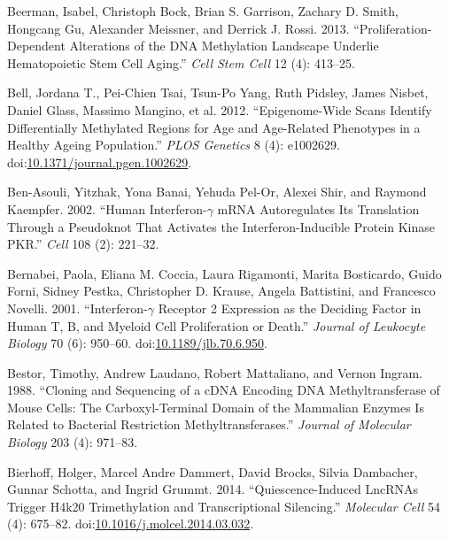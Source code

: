 \documentclass[onehalf,12pt]{beavtex}
\begin{document}
  \hypertarget{ref-BeermanProliferationdependentalterationsDNA2013}{}
  Beerman, Isabel, Christoph Bock, Brian S. Garrison, Zachary D. Smith,
  Hongcang Gu, Alexander Meissner, and Derrick J. Rossi. 2013.
  ``Proliferation-Dependent Alterations of the DNA Methylation Landscape
  Underlie Hematopoietic Stem Cell Aging.'' \emph{Cell Stem Cell} 12 (4):
  413--25.
  
  \hypertarget{ref-BellEpigenomeWideScansIdentify2012a}{}
  Bell, Jordana T., Pei-Chien Tsai, Tsun-Po Yang, Ruth Pidsley, James
  Nisbet, Daniel Glass, Massimo Mangino, et al. 2012. ``Epigenome-Wide
  Scans Identify Differentially Methylated Regions for Age and Age-Related
  Phenotypes in a Healthy Ageing Population.'' \emph{PLOS Genetics} 8 (4):
  e1002629.
  doi:\href{https://doi.org/10.1371/journal.pgen.1002629}{10.1371/journal.pgen.1002629}.
  
  \hypertarget{ref-Ben-AsouliHumaninterferongmRNA2002}{}
  Ben-Asouli, Yitzhak, Yona Banai, Yehuda Pel-Or, Alexei Shir, and Raymond
  Kaempfer. 2002. ``Human Interferon-\(\gamma\) mRNA Autoregulates Its
  Translation Through a Pseudoknot That Activates the Interferon-Inducible
  Protein Kinase PKR.'' \emph{Cell} 108 (2): 221--32.
  
  \hypertarget{ref-BernabeiInterferongreceptorexpression2001}{}
  Bernabei, Paola, Eliana M. Coccia, Laura Rigamonti, Marita Bosticardo,
  Guido Forni, Sidney Pestka, Christopher D. Krause, Angela Battistini,
  and Francesco Novelli. 2001. ``Interferon-\(\gamma\) Receptor 2
  Expression as the Deciding Factor in Human T, B, and Myeloid Cell
  Proliferation or Death.'' \emph{Journal of Leukocyte Biology} 70 (6):
  950--60.
  doi:\href{https://doi.org/10.1189/jlb.70.6.950}{10.1189/jlb.70.6.950}.
  
  \hypertarget{ref-BestorCloningsequencingcDNA1988}{}
  Bestor, Timothy, Andrew Laudano, Robert Mattaliano, and Vernon Ingram.
  1988. ``Cloning and Sequencing of a cDNA Encoding DNA Methyltransferase
  of Mouse Cells: The Carboxyl-Terminal Domain of the Mammalian Enzymes Is
  Related to Bacterial Restriction Methyltransferases.'' \emph{Journal of
  Molecular Biology} 203 (4): 971--83.
  
  \hypertarget{ref-BierhoffQuiescenceInducedLncRNAsTrigger2014}{}
  Bierhoff, Holger, Marcel Andre Dammert, David Brocks, Silvia Dambacher,
  Gunnar Schotta, and Ingrid Grummt. 2014. ``Quiescence-Induced LncRNAs
  Trigger H4k20 Trimethylation and Transcriptional Silencing.''
  \emph{Molecular Cell} 54 (4): 675--82.
  doi:\href{https://doi.org/10.1016/j.molcel.2014.03.032}{10.1016/j.molcel.2014.03.032}.
  
\end{document}

